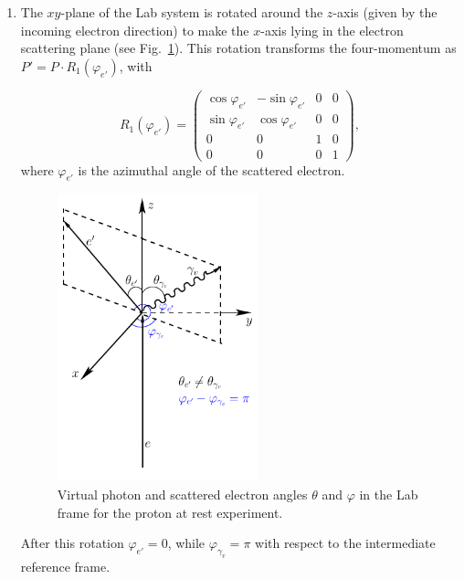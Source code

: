 \begin{enumerate}
\item The $xy$-plane of the Lab system is rotated around the $z$-axis (given by the incoming electron direction) to make the $x$-axis lying in the electron scattering plane (see Fig.~\ref{fig:cr_sec_el_angles}). This rotation transforms the four-momentum as $P' = P \cdot R_1(\varphi_{e'})$, with 

\begin{equation}
R_{1}(\varphi_{e'}) = \begin{pmatrix}
 \cos\varphi_{e'}& -\sin\varphi_{e'} & 0 &0 \\ 
 \sin\varphi_{e'}& \cos\varphi_{e'} &  0& 0\\ 
0 & 0 & 1 &0 \\ 
 0&  0&  0&1 
\end{pmatrix},
\end{equation}
where $\varphi_{e'}$ is the azimuthal angle of the scattered electron.

\begin{figure}[htp]
\begin{center}
\includegraphics[width=5.8cm]{pictures/appendix/electron_angles.pdf}
\caption{\small Virtual photon and scattered electron angles $\theta$ and $\varphi$ in the Lab frame for the proton at rest experiment.} \label{fig:cr_sec_el_angles}
\end{center}
\end{figure}

After this rotation $\varphi_{e'} = 0$, while $\varphi_{\gamma_v} = \pi$ with respect to the intermediate reference frame.


\end{enumerate}
